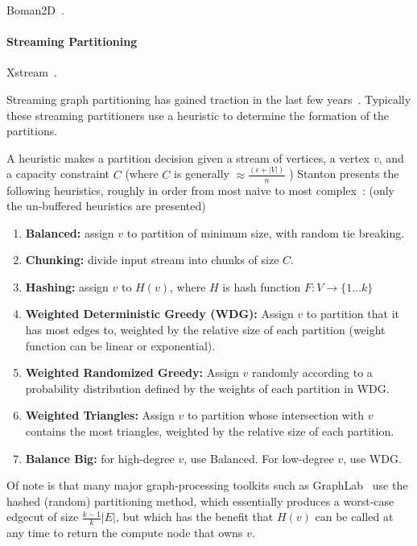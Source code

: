 Boman2D~\cite{Bomansc13}.








\paragraph{Streaming Partitioning}
Xstream~\cite{xstream}.

Streaming graph partitioning has gained traction in the last few years~\cite{DBLP:journals/corr/abs-1212-1121,Stanton:2012:SGP:2339530.2339722,tsourakakis2012fennel}.
Typically these streaming partitioners use a heuristic to determine the formation of the partitions.

A heuristic makes a partition decision given a stream of vertices, a vertex $v$, and a capacity constraint $C$ (where $C$ is generally $\approx \frac{(\epsilon+|V|)}{n}$ )
Stanton presents the following heuristics, roughly in order from most naive to most complex~\cite{Stanton:2012:SGP:2339530.2339722}: (only the un-buffered heuristics are presented)

\begin{enumerate}
\item \textbf{Balanced:} assign $v$ to partition of minimum size, with random tie breaking.
\item \textbf{Chunking:} divide input stream into chunks of size $C$.
\item \textbf{Hashing:} assign $v$ to $H(v)$, where $H$ is hash function $F:V\to\{1\dots k\}$
\item \textbf{Weighted Deterministic Greedy (WDG):} Assign $v$ to partition that it has most edges to, weighted by the relative size of each partition (weight function can be linear or exponential).
\item \textbf{Weighted Randomized Greedy:} Assign $v$ randomly according to a probability distribution defined by the weights of each partition in WDG.
\item \textbf{Weighted Triangles:} Assign $v$ to partition whose intersection with $v$ contains the most triangles, weighted by the relative size of each partition.
\item \textbf{Balance Big:} for high-degree $v$, use Balanced. For low-degree $v$, use WDG.
\end{enumerate}

Of note is that many major graph-processing toolkits such as GraphLab~\cite{Low:2012:DGF:2212351.2212354} use the hashed (random) partitioning method, which essentially produces a worst-case edgecut of size $\frac{k-1}{k}|E|$, but which has the benefit that $H(v)$ can be called at any time to return the compute node that owns $v$.

